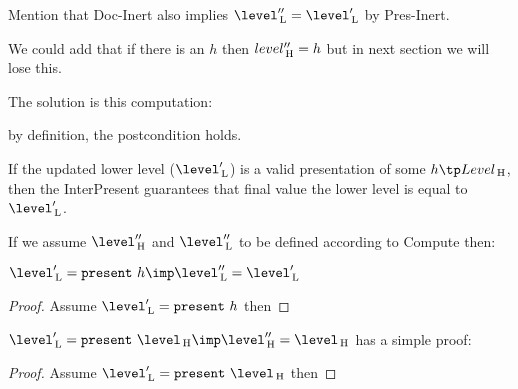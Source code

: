 Mention that {\sc Doc-Inert} also implies $\level''\L = \level'\L$ by {\sc Pres-Inert}.

We could add that if there is an $h$ then $level''_{\, \mathrm H} = h$ but in next section we will lose this.

The solution is this computation: 



by definition, the postcondition holds.


If the updated lower level ($\level'\L$) is a valid presentation of some $h \tp Level\H$, then the {\sc InterPresent} guarantees that final value the lower level is equal to $\level'\L$.

If we assume $\level''\H$ and $\level''\L$ to be defined according to {\sc Compute} then:

$\level'\L = \present~h \imp \level''\L = \level'\L$

\begin{proof} Assume $\level'\L = \present~h$ then
\end{proof}


$\level'\L = \present~\level\H \imp \level''\H = \level\H$ has a simple proof:


\begin{proof} Assume $\level'\L = \present~\level\H$ then
\end{proof}


